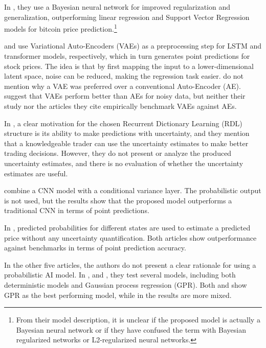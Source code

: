 In \textcite{jang2018empirical}, they use a Bayesian neural network for improved regularization and generalization, outperforming linear regression and Support Vector Regression models for bitcoin price prediction.\footnote{From their model description, it is unclear if the proposed model is actually a Bayesian neural network or if they have confused the term with Bayesian regularized networks or L2-regularized neural networks.}

\textcite{choudhury2020enhancing} and \textcite{tang2024period} use Variational Auto-Encoders (VAEs) as a preprocessing step for LSTM and transformer models, respectively, which in turn generates point predictions for stock prices. The idea is that by first mapping the input to a lower-dimensional latent space, noise can be reduced, making the regression task easier. \textcite{choudhury2020enhancing} do not mention why a VAE was preferred over a conventional Auto-Encoder (AE). \textcite{tang2024period} suggest that VAEs perform better than AEs for noisy data, but neither their study nor the articles they cite empirically benchmark VAEs against AEs.

In \textcite{Sharma2021}, a clear motivation for the chosen Recurrent Dictionary Learning (RDL) structure is its ability to make predictions with uncertainty, and they mention that a knowledgeable trader can use the uncertainty estimates to make better trading decisions. However, they do not present or analyze the produced uncertainty estimates, and there is no evaluation of whether the uncertainty estimates are useful.

\textcite{Daniali2021} combine a CNN model with a conditional variance layer. The probabilistic output is not used, but the results show that the proposed model outperforms a traditional CNN in terms of point predictions.

In \textcite{govindasamy2014prediction, li2010stochastic}, predicted probabilities for different states are used to estimate a predicted price without any uncertainty quantification. Both articles show outperformance against benchmarks in terms of point prediction accuracy.

In the other five articles, the authors do not present a clear rationale for using a probabilistic AI model. In \textcite{Zmuk2020gpr}, \textcite{Park2014gpr} and \textcite{Papaioannou2022gpr}, they test several models, including both deterministic models and Gaussian process regression (GPR). Both \textcite{Park2014gpr} and \textcite{Papaioannou2022gpr} show GPR as the best performing model, while in \textcite{Zmuk2020gpr} the results are more mixed.

